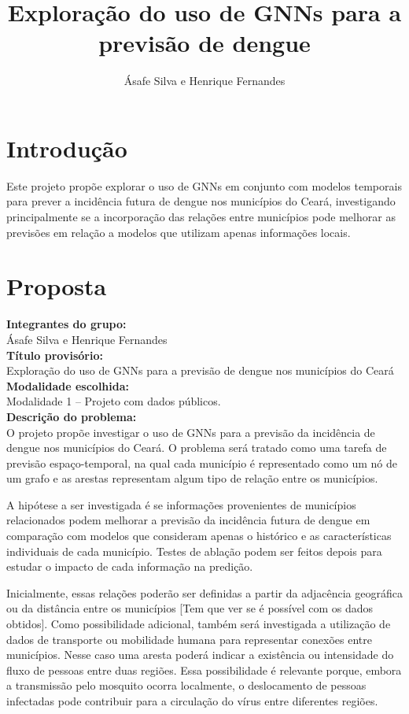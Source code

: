 \documentclass{article}
\title{Exploração do uso de GNNs para a previsão de dengue}
\author{Ásafe Silva e Henrique Fernandes}
\date{}
\begin{document}
\maketitle

\section{Introdução}

Este projeto propõe explorar o uso de GNNs em conjunto com modelos temporais para prever a incidência futura de dengue nos municípios do Ceará, investigando principalmente se a incorporação das relações entre municípios pode melhorar as previsões em relação a modelos que utilizam apenas informações locais.

\section{Proposta}

\textbf{Integrantes do grupo:} \\
Ásafe Silva e Henrique Fernandes \\

\textbf{Título provisório:} \\
Exploração do uso de GNNs para a previsão de dengue nos municípios do Ceará \\

\textbf{Modalidade escolhida:} \\
Modalidade 1 -- Projeto com dados públicos. \\

\textbf{Descrição do problema:} \\
O projeto propõe investigar o uso de GNNs para a previsão da incidência de dengue nos municípios do Ceará. O problema será tratado como uma tarefa de previsão espaço-temporal, na qual cada município é representado como um nó de um grafo e as arestas representam algum tipo de relação entre os municípios.

A hipótese a ser investigada é se informações provenientes de municípios relacionados podem melhorar a previsão da incidência futura de dengue em comparação com modelos que consideram apenas o histórico e as características individuais de cada município. Testes de ablação podem ser feitos depois para estudar o impacto de cada informação na predição.

Inicialmente, essas relações poderão ser definidas a partir da adjacência geográfica ou da distância entre os municípios [Tem que ver se é possível com os dados obtidos]. Como possibilidade adicional, também será investigada a utilização de dados de transporte ou mobilidade humana para representar conexões entre municípios. Nesse caso uma aresta poderá indicar a existência ou intensidade do fluxo de pessoas entre duas regiões. Essa possibilidade é relevante porque, embora a transmissão pelo mosquito ocorra localmente, o deslocamento de pessoas infectadas pode contribuir para a circulação do vírus entre diferentes regiões.
\end{document}
